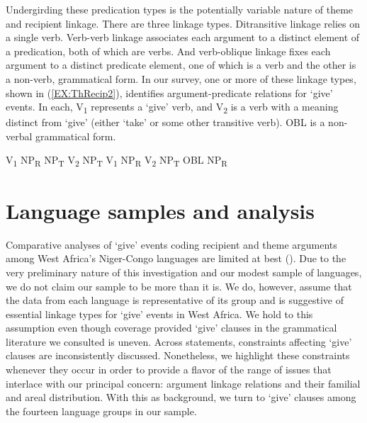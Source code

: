 \documentclass[output=paper,colorlinks,citecolor=brown]{langscibook}
\begin{document}
\begin{sloppypar}
Undergirding these predication types is the potentially  variable nature of theme and recipient linkage. There are three linkage types. Ditransitive linkage relies on a single verb. Verb-verb linkage associates each argument to a distinct element of a predication, both of which are verbs. And verb-oblique linkage fixes each argument to a distinct predicate element, one of which is a verb and the other is a non-verb, grammatical form. In our survey, one or more of these linkage types, shown in (\ref{EX:ThRecip2}), identifies argument-predicate relations for ‘give’ events. In each, V\textsubscript{1} represents a ‘give’ verb, and V\textsubscript{2} is a verb with a meaning distinct from ‘give’ (either ‘take’ or some other transitive verb). OBL is a non-verbal grammatical form.
\end{sloppypar}

\ea \label{EX:ThRecip2}
\ea V\textsubscript{1} NP\textsubscript{R} NP\textsubscript{T}
\ex V\textsubscript{2} NP\textsubscript{T} V\textsubscript{1} NP\textsubscript{R}
\ex V\textsubscript{2} NP\textsubscript{T} OBL NP\textsubscript{R} 
\z
\z



\section{Language samples and analysis}

Comparative analyses of ‘give’ events coding recipient and theme arguments among West Africa’s Niger-Congo languages are limited at best (\cite{Ameka2013}). Due to the very preliminary nature of this investigation and our modest sample of languages, we do not claim our sample to be more than it is. We do, however, assume that the data from each language is representative of its group and is suggestive of essential linkage types for ‘give’ events in West Africa. We hold to this assumption even though coverage provided ‘give’ clauses in the grammatical literature we consulted is uneven. Across statements, constraints affecting ‘give’ clauses are inconsistently discussed. Nonetheless, we highlight these constraints whenever they occur in order to provide a flavor of the range of issues that interlace with our principal concern: argument linkage relations and their familial and areal  distribution. With this as background, we turn to ‘give’ clauses among the fourteen language groups in our sample.
\end{document}
